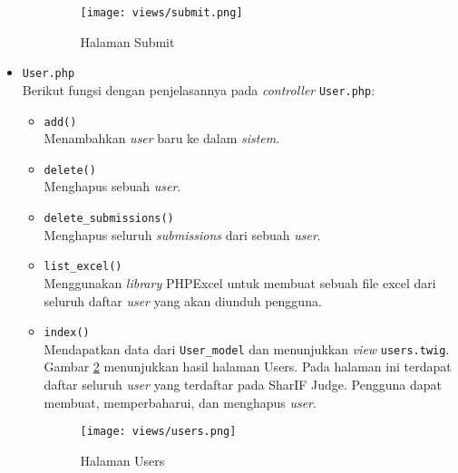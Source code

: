 \begin{itemize}
\begin{itemize}
                        \begin{figure}[H]
                              \centering
                              \texttt{[image: views/submit.png]}
                              \caption{Halaman Submit}
                              \label{fig:3:1:1:submit}
                        \end{figure}

            \end{itemize}

      \item \verb|User.php| \\
            Berikut fungsi dengan penjelasannya pada \textit{controller} \verb|User.php|:

            \begin{itemize}
                  \item \verb|add()| \\
                        Menambahkan \textit{user} baru ke dalam \textit{sistem}.
                  \item \verb|delete()| \\
                        Menghapus sebuah \textit{user}.
                  \item \verb|delete_submissions()| \\
                        Menghapus seluruh \textit{submissions} dari sebuah \textit{user}.
                  \item \verb|list_excel()| \\
                        Menggunakan \textit{library} PHPExcel untuk membuat sebuah file excel dari seluruh daftar \textit{user} yang akan diunduh pengguna.
                  \item \verb|index()| \\
                        Mendapatkan data dari \verb|User_model| dan menunjukkan \textit{view} \verb|users.twig|. Gambar \ref{fig:3:1:1:users} menunjukkan hasil halaman Users. Pada halaman ini terdapat daftar seluruh \textit{user} yang terdaftar pada SharIF Judge. Pengguna dapat membuat, memperbaharui, dan menghapus \textit{user}.

                        \begin{figure}[H]
                              \centering
                              \texttt{[image: views/users.png]}
                              \caption{Halaman Users}
                              \label{fig:3:1:1:users}
                        \end{figure}


            \end{itemize}

\end{itemize}

